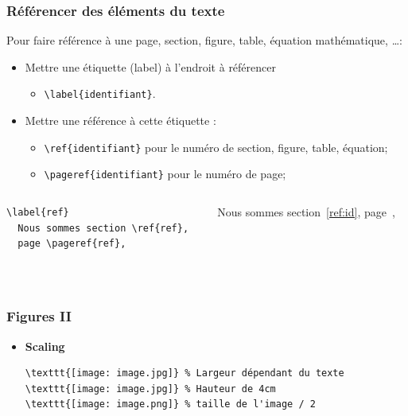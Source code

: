 \begin{frame}[fragile]
  \frametitle{Référencer des éléments du texte}
  Pour faire référence à une page, section, figure, table, équation mathématique, \dots:
  \begin{itemize}
    \item Mettre une étiquette (label) à l'endroit à référencer
      \begin{itemize}
        \item \lstinline|\label{identifiant}|.
      \end{itemize}
    \item Mettre une référence à cette étiquette :
      \begin{itemize}
        \item \lstinline|\ref{identifiant}| pour le numéro de section, figure, table, équation;
        \item \lstinline|\pageref{identifiant}| pour le numéro de page;
      \end{itemize}
  \end{itemize}
  \begin{columns}
    \begin{column}{0.5\textwidth}
      \begin{lstlisting}[style=nonumbers]
  \label{ref}
  Nous sommes section \ref{ref},
  page \pageref{ref},
      \end{lstlisting}
    \end{column}
    \begin{column}{0.5\textwidth}
      \label{ref:id}
      \par{}Nous sommes section~\ref{ref:id},
      page~\pageref{ref:id},
    \end{column}
  \end{columns}
\end{frame}

\begin{frame}[fragile]\
  \frametitle{Figures II}
  \begin{itemize}

    \item \textbf{Scaling}
  \begin{lstlisting}[style=nonumbers]
\texttt{[image: image.jpg]} % Largeur dépendant du texte
\texttt{[image: image.jpg]} % Hauteur de 4cm
\texttt{[image: image.png]} % taille de l'image / 2
  \end{lstlisting}

  \vspace{2em}
  \end{itemize}
\end{frame}

